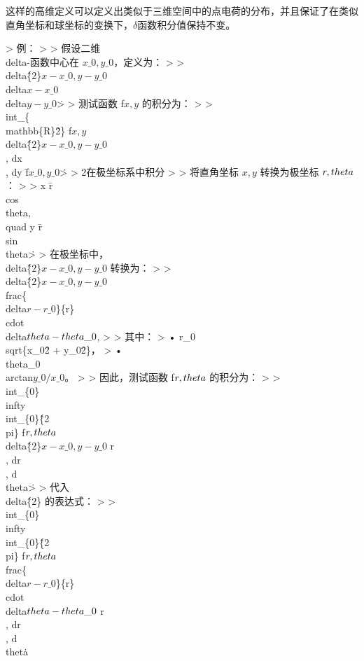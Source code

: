 \documentclass[lang=cn,10pt,newtx,bibend=biber,device=pad]{elegantbook}
\begin{document}
这样的高维定义可以定义出类似于三维空间中的点电荷的分布，并且保证了在类似直角坐标和球坐标的变换下，$\delta$函数积分值保持不变。

> 例：
>
> 假设二维 \\delta-函数中心在 \(x\_0, y\_0\)，定义为：
>
> \\delta\^\{\(2\)\}\(x - x\_0, y - y\_0\) \= \\delta\(x - x\_0\) \\delta\(y - y\_0\)\.
>
> 测试函数 f\(x, y\) 的积分为：
>
> \\int\_\{\\mathbb\{R\}\^2\} f\(x, y\) \\delta\^\{\(2\)\}\(x - x\_0, y - y\_0\) \\, dx \\, dy \= f\(x\_0, y\_0\)\.
>
> 2\. 在极坐标系中积分
>
> 将直角坐标 \(x, y\) 转换为极坐标 \(r, \\theta\)：
>
> x \= r \\cos\\theta, \\quad y \= r \\sin\\theta\.
>
> 在极坐标中，\\delta\^\{\(2\)\}\(x - x\_0, y - y\_0\) 转换为：
>
> \\delta\^\{\(2\)\}\(x - x\_0, y - y\_0\) \= \\frac\{\\delta\(r - r\_0\)\}\{r\} \\cdot \\delta\(\\theta - \\theta\_0\),
>
> 其中：  
> 	•	r\_0 \= \\sqrt\{x\_0\^2 + y\_0\^2\}，  
> 	•	\\theta\_0 \= \\arctan\(y\_0 / x\_0\)。
>
> 因此，测试函数 f\(r, \\theta\) 的积分为：
>
> \\int\_\{0\}\^\\infty \\int\_\{0\}\^\{2\\pi\} f\(r, \\theta\) \\delta\^\{\(2\)\}\(x - x\_0, y - y\_0\) r \\, dr \\, d\\theta\.
>
> 代入 \\delta\^\{\(2\)\} 的表达式：
>
> \\int\_\{0\}\^\\infty \\int\_\{0\}\^\{2\\pi\} f\(r, \\theta\) \\frac\{\\delta\(r - r\_0\)\}\{r\} \\cdot \\delta\(\\theta - \\theta\_0\) r \\, dr \\, d\\theta\.
\end{document}
